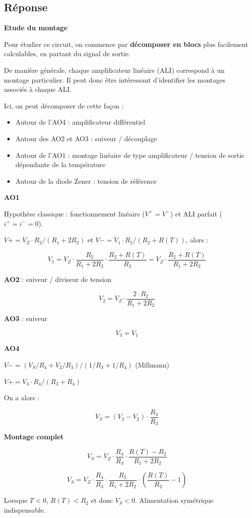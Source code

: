 \subsection*{Réponse}


\textbf{Etude du montage}

Pour étudier ce circuit, on commence par \textbf{décomposer en blocs} plus facilement calculables, en partant du signal de sortie.

De manière générale, chaque amplificateur linéaire (ALI) correspond à un montage particulier. Il peut donc être intéressant d'identifier les montages associés à chaque ALI.

Ici, on peut décomposer de cette façon : 
\begin{itemize}
	\item Autour de l'AO4 : amplificateur différentiel 
	\item Autour des AO2 et AO3 : suiveur / découplage
	\item Autour de l'AO1 : montage linéaire de type amplificateur / tension de sortie dépendante de la température
	\item Autour de la diode Zener : tension de référence	
\end{itemize}


\textbf{AO1} 

Hypothèse classique : fonctionnement linéaire ($V^+ = V^-$) et ALI parfait ($i^+ = i^- = 0$).

$V+ = V_Z \cdot R_2 / (R_1 + 2 R_2)$ et $V- = V_1 \cdot R_2 / (R_2 + R(T))$, alors : 

$$V_1 = V_Z \cdot \frac{R_2}{R_1 + 2 R_2} \cdot \frac{R_2 + R(T)}{R_2} = V_Z \cdot \frac{R_2 + R(T)}{R_1 + 2 R_2}$$

\textbf{AO2} : suiveur / diviseur de tension

$$V_2 =  V_Z \cdot \frac{2 \cdot R_2}{R_1 + 2 R_2}$$

\textbf{AO3} : suiveur

$$V_3 = V_1$$

\textbf{AO4} 

$V- = (V_S/R_4 + V_2/R_3) / (1/R_3 + 1/R_4)$ (Millmann)

$V+ = V_3 \cdot R_4 / (R_3 + R_4)$

On a alors : 

$$V_S = (V_3 - V_2) \cdot \frac{R_4}{R_3}$$


\textbf{Montage complet}

$$V_S = V_Z \cdot \frac{R_4}{R_3} \cdot \frac{R(T) - R_2}{R_1 + 2 R_2}$$

$$V_S = V_Z \cdot \frac{R_4}{R_3} \cdot \frac{R_2}{R_1 + 2 R_2} \cdot (\frac{R(T)}{R_2} - 1)$$


Lorsque $T < 0$, $R(T) < R_2$ et donc $V_S < 0$. Alimentation symétrique indispensable.




